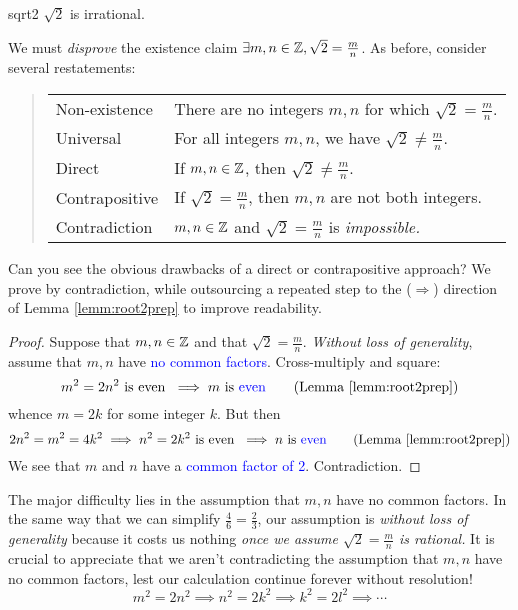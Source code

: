 \begin{thm}{}{sqrt2}
	$\sqrt 2$ is irrational.
\end{thm}

We must \emph{disprove} the existence claim $\exists m,n\in\mathbb{Z}, \sqrt 2=\frac mn$.
As before, consider several restatements:\vspace{-5pt}
\begin{quote}
	\begin{tabular}{@{}ll}
		Non-existence& There are no integers $m,n$ for which $\sqrt 2=\frac mn$.\\
		Universal&For all integers $m,n$, we have $\sqrt 2\neq \frac mn$.\\
		Direct&If $m,n\in\mathbb{Z}$, then $\sqrt 2\neq\frac mn$.\\
		Contrapositive&If $\sqrt 2=\frac mn$, then $m,n$ are not both integers.\\
		Contradiction&$m,n\in\mathbb{Z}$ and $\sqrt 2=\frac mn$ is \emph{impossible.}
	\end{tabular}
\end{quote}

Can you see the obvious drawbacks of a direct or contrapositive approach?
We prove by contradiction, while outsourcing a repeated step to the ($\Rightarrow$) direction of Lemma \ref{lemm:root2prep} to improve readability.

\begin{proof}
	Suppose that $m,n\in\mathbb{Z}$ and that $\sqrt 2=\frac mn$. \emph{Without loss of generality}, assume that $m,n$ have \textcolor{blue}{no common factors}. Cross-multiply and square:
	\[
		m^2=2n^2\text{ is even }\implies m\text{ is \textcolor{blue}{even}} \tag{Lemma \ref{lemm:root2prep}}
	\]
	whence $m=2k$ for some integer $k$. But then
	\[
		2n^2=m^2=4k^2\implies n^2=2k^2\text{ is even }\implies n\text{ is \textcolor{blue}{even}} \tag{Lemma \ref{lemm:root2prep}}
	\]
	We see that $m$ and $n$ have a \textcolor{blue}{common factor of 2}. Contradiction.
\end{proof}


The major difficulty lies in the assumption that $m,n$ have no common factors. In the same way that we can simplify $\frac 46=\frac 23$, our assumption is \emph{without loss of generality} because it costs us nothing \emph{once we assume $\sqrt 2=\frac mn$ is rational.} It is crucial to appreciate that we aren't contradicting the assumption that $m,n$ have no common factors, lest our calculation continue forever without resolution!
\[
	m^2=2n^2\implies n^2=2k^2\implies k^2=2l^2\implies\cdots
\]

